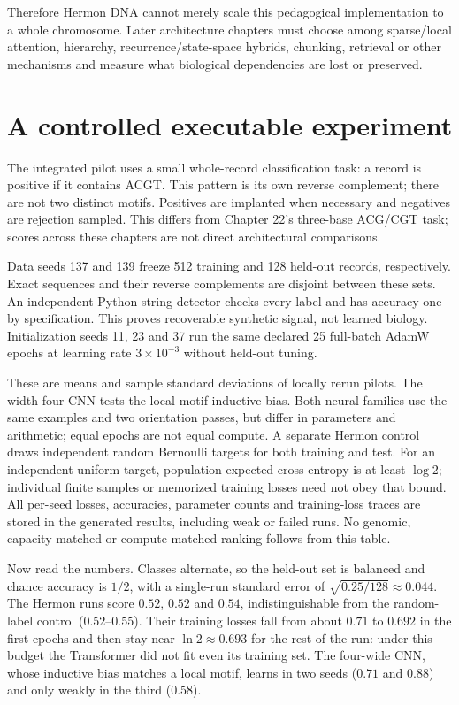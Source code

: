 Therefore Hermon DNA cannot merely scale this pedagogical implementation to a whole
chromosome. Later architecture chapters must choose among sparse/local attention,
hierarchy, recurrence/state-space hybrids, chunking, retrieval or other mechanisms
and measure what biological dependencies are lost or preserved.

\section{A controlled executable experiment}

The integrated pilot uses a small whole-record classification task: a record is
positive if it contains ACGT. This pattern is its own reverse complement; there
are not two distinct motifs. Positives are implanted when necessary and negatives
are rejection sampled. This differs from Chapter 22's three-base ACG/CGT task;
scores across these chapters are not direct architectural comparisons.

Data seeds 137 and 139 freeze 512 training and 128 held-out records, respectively.
Exact sequences and their reverse complements are disjoint between these sets.
An independent Python string detector checks every label and has accuracy one by
specification. This proves recoverable synthetic signal, not learned biology.
Initialization seeds 11, 23 and 37 run the same declared 25 full-batch AdamW epochs
at learning rate $3\times10^{-3}$ without held-out tuning.

\begin{center}\end{center}
These are means and sample standard deviations of locally rerun pilots. The
width-four CNN tests the local-motif inductive bias. Both neural families use the
same examples and two orientation passes, but differ in parameters and arithmetic;
equal epochs are not equal compute. A separate Hermon control draws independent
random Bernoulli targets for both training and test. For an independent
uniform target, population expected cross-entropy is at least $\log2$;
individual finite samples or memorized training losses need not obey that bound.
All per-seed losses, accuracies, parameter counts and training-loss traces are
stored in the generated results, including weak or failed runs. No genomic,
capacity-matched or compute-matched ranking follows from this table.

Now read the numbers. Classes alternate, so the held-out set is balanced and chance
accuracy is $1/2$, with a single-run standard error of $\sqrt{0.25/128}\approx0.044$.
The Hermon runs score $0.52$, $0.52$ and $0.54$, indistinguishable from the random-label
control ($0.52$--$0.55$). Their training losses fall from about $0.71$ to $0.692$ in the
first epochs and then stay near $\ln2\approx0.693$ for the rest of the run: under this
budget the Transformer did not fit even its training set. The four-wide CNN, whose
inductive bias matches a local motif, learns in two seeds ($0.71$ and $0.88$) and only
weakly in the third ($0.58$).


